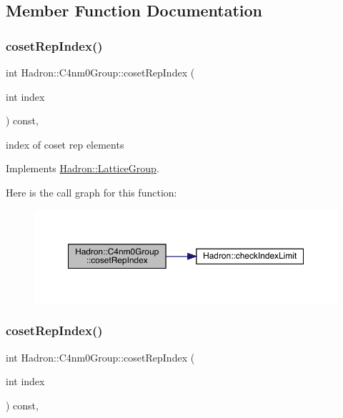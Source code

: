 \subsection{Member Function Documentation}
\mbox{\label{structHadron_1_1C4nm0Group_abac118ef8b96cecf62143c917e23736e}} 
\subsubsection{\texorpdfstring{cosetRepIndex()}{cosetRepIndex()}\hspace{0.1cm}{\footnotesize\ttfamily [1/3]}}
{\footnotesize\ttfamily int Hadron\+::\+C4nm0\+Group\+::coset\+Rep\+Index (\begin{DoxyParamCaption}\item[{int}]{index }\end{DoxyParamCaption}) const\hspace{0.3cm}{\ttfamily [inline]}, {\ttfamily [virtual]}}

index of coset rep elements 

Implements \mbox{\hyperlink{structHadron_1_1LatticeGroup_a7e3b9b5e2f596e6c40d64aa939a3ad6c}{Hadron\+::\+Lattice\+Group}}.

Here is the call graph for this function\+:
\nopagebreak
\begin{figure}[H]
\begin{center}
\leavevmode
\includegraphics[width=350pt]{da/da1/structHadron_1_1C4nm0Group_abac118ef8b96cecf62143c917e23736e_cgraph}
\end{center}
\end{figure}
\mbox{\label{structHadron_1_1C4nm0Group_abac118ef8b96cecf62143c917e23736e}} 
\subsubsection{\texorpdfstring{cosetRepIndex()}{cosetRepIndex()}\hspace{0.1cm}{\footnotesize\ttfamily [2/3]}}
{\footnotesize\ttfamily int Hadron\+::\+C4nm0\+Group\+::coset\+Rep\+Index (\begin{DoxyParamCaption}\item[{int}]{index }\end{DoxyParamCaption}) const\hspace{0.3cm}{\ttfamily [inline]}, {\ttfamily [virtual]}}


